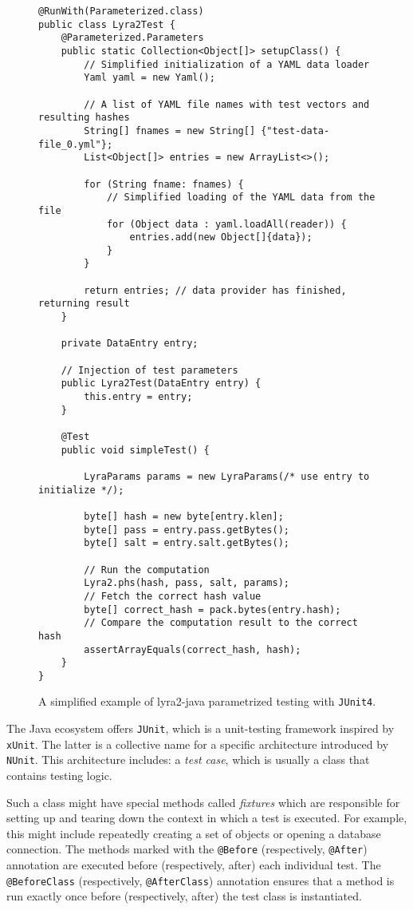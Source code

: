 \begin{figure}
\small
\begin{verbatim}
@RunWith(Parameterized.class)
public class Lyra2Test {
    @Parameterized.Parameters
    public static Collection<Object[]> setupClass() {
        // Simplified initialization of a YAML data loader
        Yaml yaml = new Yaml();

        // A list of YAML file names with test vectors and resulting hashes
        String[] fnames = new String[] {"test-data-file_0.yml"};
        List<Object[]> entries = new ArrayList<>();

        for (String fname: fnames) {
            // Simplified loading of the YAML data from the file
            for (Object data : yaml.loadAll(reader)) {
                entries.add(new Object[]{data});
            }
        }

        return entries; // data provider has finished, returning result
    }

    private DataEntry entry;

    // Injection of test parameters
    public Lyra2Test(DataEntry entry) {
        this.entry = entry;
    }

    @Test
    public void simpleTest() {

        LyraParams params = new LyraParams(/* use entry to initialize */);

        byte[] hash = new byte[entry.klen];
        byte[] pass = entry.pass.getBytes();
        byte[] salt = entry.salt.getBytes();

        // Run the computation
        Lyra2.phs(hash, pass, salt, params);
        // Fetch the correct hash value
        byte[] correct_hash = pack.bytes(entry.hash);
        // Compare the computation result to the correct hash
        assertArrayEquals(correct_hash, hash);
    }
}
\end{verbatim}
\normalsize
\caption{A simplified example of lyra2-java parametrized testing with \texttt{JUnit4}.}
\label{fig:junit4-parametrization}
\end{figure}

The Java ecosystem offers \texttt{JUnit}, which is a unit-testing framework inspired by \texttt{xUnit}. The latter is a collective name for a specific architecture introduced by \texttt{NUnit}. This architecture includes: a \emph{test case}, which is usually a class that contains testing logic.

Such a class might have special methods called \emph{fixtures} which are responsible for setting up and tearing down the context in which a test is executed. For example, this might include repeatedly creating a set of objects or opening a database connection. The methods marked with the \texttt{@Before} (respectively, \texttt{@After}) annotation are executed before (respectively, after) each individual test. The \texttt{@BeforeClass} (respectively, \texttt{@AfterClass}) annotation ensures that a method is run exactly once before (respectively, after) the test class is instantiated.

